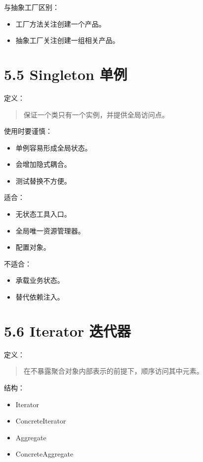 \documentclass[UTF8,zihao=-4]{ctexart}
\begin{document}
与抽象工厂区别：

\begin{itemize}
\item 工厂方法关注创建一个产品。
\item 抽象工厂关注创建一组相关产品。
\end{itemize}

\section{5.5 Singleton 单例}

定义：

\begin{quote}
保证一个类只有一个实例，并提供全局访问点。
\end{quote}

使用时要谨慎：

\begin{itemize}
\item 单例容易形成全局状态。
\item 会增加隐式耦合。
\item 测试替换不方便。
\end{itemize}

适合：

\begin{itemize}
\item 无状态工具入口。
\item 全局唯一资源管理器。
\item 配置对象。
\end{itemize}

不适合：

\begin{itemize}
\item 承载业务状态。
\item 替代依赖注入。
\end{itemize}

\section{5.6 Iterator 迭代器}

定义：

\begin{quote}
在不暴露聚合对象内部表示的前提下，顺序访问其中元素。
\end{quote}

结构：

\begin{itemize}
\item Iterator
\item ConcreteIterator
\item Aggregate
\item ConcreteAggregate
\end{itemize}
\end{document}
